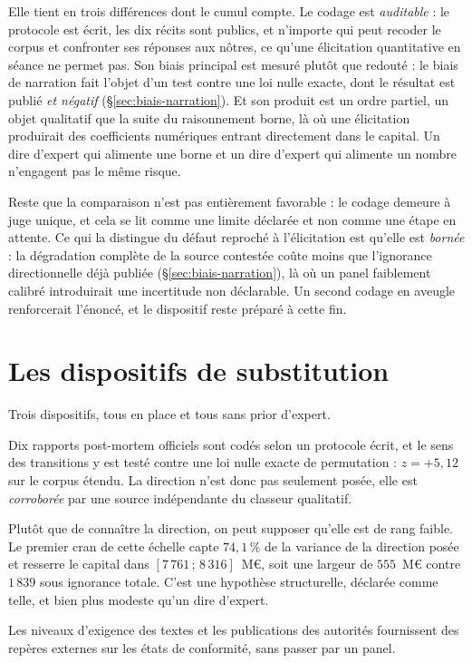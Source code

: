 Elle tient en trois différences dont le cumul compte. Le codage est
\emph{auditable} : le protocole est écrit, les dix récits sont publics, et n'importe qui peut
recoder le corpus et confronter ses réponses aux nôtres, ce qu'une élicitation quantitative en
séance ne permet pas. Son biais principal est mesuré plutôt que redouté : le biais de
narration fait l'objet d'un test contre une loi nulle exacte, dont le résultat est publié
\emph{et négatif} (\S\ref{sec:biais-narration}). Et son produit est un ordre partiel,
un objet qualitatif que la suite du raisonnement borne, là où une élicitation produirait des
coefficients numériques entrant directement dans le capital. Un dire d'expert qui alimente une
borne et un dire d'expert qui alimente un nombre n'engagent pas le même risque.

Reste que la comparaison n'est pas entièrement favorable : le codage demeure à juge
unique, et cela se lit comme une limite déclarée et non comme une étape en attente. Ce
qui la distingue du défaut reproché à l'élicitation est qu'elle est \emph{bornée} : la
dégradation complète de la source contestée coûte moins que l'ignorance directionnelle déjà
publiée (\S\ref{sec:biais-narration}), là où un panel faiblement calibré introduirait une
incertitude non déclarable. Un second codage en aveugle renforcerait l'énoncé, et le dispositif
reste préparé à cette fin.

\section{Les dispositifs de substitution}

Trois dispositifs, tous en place et tous sans prior d'expert.

\begin{description}[itemsep=3pt,topsep=3pt]
\item[Le corpus documentaire.] Dix rapports post-mortem officiels sont codés selon un protocole
      écrit, et le sens des transitions y est testé contre une loi nulle exacte de permutation :
      $z = +5{,}12$ sur le corpus étendu. La direction n'est donc pas seulement posée, elle est
      \emph{corroborée} par une source indépendante du classeur qualitatif.
\item[L'échelle de repli sur la direction.] Plutôt que de connaître la direction, on peut
      supposer qu'elle est de rang faible. Le premier cran de cette échelle capte $74{,}1\,\%$
      de la variance de la direction posée et resserre le capital dans
      $[7\,761\,;\,8\,316]$~M\euro, soit une largeur de $555$~M\euro{} contre $1\,839$ sous
      ignorance totale. C'est une hypothèse structurelle, déclarée comme telle, et bien plus
      modeste qu'un dire d'expert.
\item[Les ancrages réglementaires.] Les niveaux d'exigence des textes et les publications des
      autorités fournissent des repères externes sur les états de conformité, sans passer par un
      panel.
\end{description}

